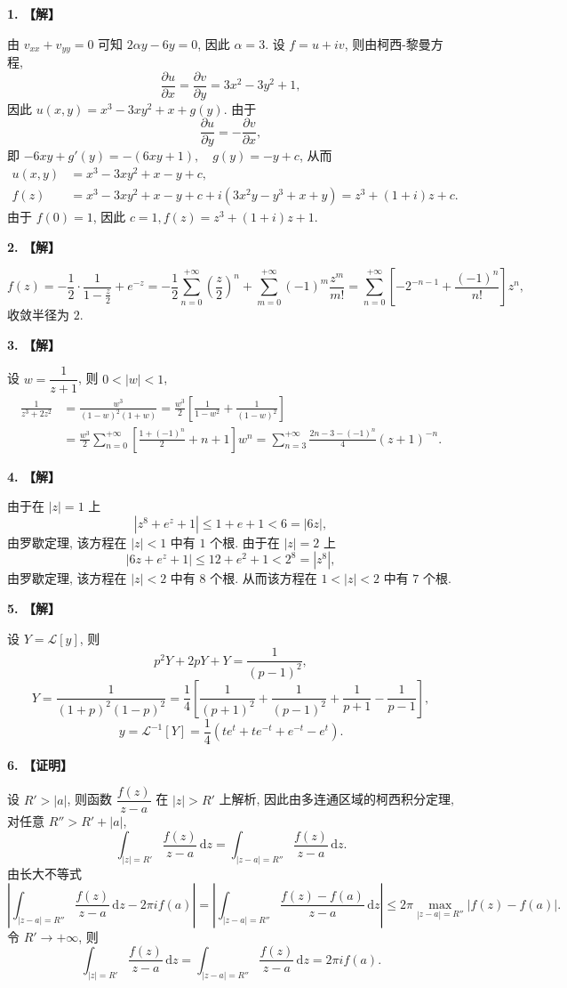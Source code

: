 \documentclass[simple]{hfutexam}
\newcommand{\diff}{\,\mathrm{d}}
\newcommand\msl{\mathscr{L}}
\begin{document}

\textbf{1. 【解】}

由 $v_{xx}+v_{yy}=0$ 可知 $2\alpha y-6y=0$, 因此 $\alpha=3$.
设 $f=u+iv$, 则由柯西-黎曼方程,
  \[\frac{\partial u}{\partial x}=\frac{\partial v}{\partial y}=3x^2-3y^2+1,\]
因此 $u(x,y)=x^3-3xy^2+x+g(y)$.
由于
  \[\frac{\partial u}{\partial y}=-\frac{\partial v}{\partial x},\]
即 $-6xy+g'(y)=-(6xy+1),\quad g(y)=-y+c$, 从而
\begin{align*}
u(x,y)&=x^3-3xy^2+x-y+c,\\
f(z)&=x^3-3xy^2+x-y+c+i(3x^2y-y^3+x+y)
  =z^3+(1+i)z+c.
\end{align*}
由于 $f(0)=1$, 因此 $c=1,f(z)=z^3+(1+i)z+1$.

\textbf{2. 【解】}

\[f(z)=-\frac{1}{2}\cdot\frac{1}{1-\frac z2}+e^{-z}
=-\frac{1}{2}\sum_{n=0}^{+\infty} \left(\frac{z}{2}\right)^n+\sum_{m=0}^{+\infty} (-1)^m\frac{z^m}{m!}
=\sum_{n=0}^{+\infty} \left[-2^{-n-1}+\frac{(-1)^n}{n!}\right]z^n,\]
收敛半径为 $2$.

\textbf{3. 【解】}

设 $w=\dfrac1{z+1}$, 则 $0<|w|<1$,
\begin{align*}
\frac{1}{z^3+2z^2}&=\frac{w^3}{(1-w)^2(1+w)}=\frac{w^3}{2}\left[\frac{1}{1-w^2}+\frac{1}{(1-w)^2}\right]\\
&=\frac{w^3}{2}\sum_{n=0}^{+\infty}\left[\frac{1+(-1)^n}{2}+n+1\right]w^n
=\sum_{n=3}^{+\infty}\frac{2n-3-(-1)^n}{4}(z+1)^{-n}.
\end{align*}

\textbf{4. 【解】}

由于在 $|z|=1$ 上
\[|z^8+e^z+1|\le 1+e+1<6=|6z|,\]
由罗歇定理, 该方程在 $|z|<1$ 中有 $1$ 个根. 由于在 $|z|=2$ 上
\[|6z+e^z+1|\le 12+e^2+1<2^8=|z^8|,\]
由罗歇定理, 该方程在 $|z|<2$ 中有 $8$ 个根.
从而该方程在 $1<|z|<2$ 中有 $7$ 个根.

\textbf{5. 【解】}

设 $Y=\msl[y]$, 则
\[p^2Y+2pY+Y=\frac{1}{(p-1)^2},\]
\[Y=\frac{1}{(1+p)^2(1-p)^2}=\frac{1}{4}\left[\frac{1}{(p+1)^2}+\frac{1}{(p-1)^2}+\frac{1}{p+1}-\frac{1}{p-1}\right],\]
\[y=\msl^{-1}[Y]=\frac{1}{4}(te^t+te^{-t}+e^{-t}-e^t).\]

\textbf{6. 【证明】}

设 $R'>|a|$, 则函数 $\dfrac{f(z)}{z-a}$ 在 $|z|>R'$ 上解析, 因此由多连通区域的柯西积分定理, 对任意 $R''>R'+|a|$,
  \[\int_{|z|=R'} \frac{f(z)}{z-a}\diff z=\int_{|z-a|=R''} \frac{f(z)}{z-a}\diff z.\]
由长大不等式
  \[\left|\int_{|z-a|=R''} \frac{f(z)}{z-a}\diff z-2\pi if(a)\right|
  =\left|\int_{|z-a|=R''} \frac{f(z)-f(a)}{z-a}\diff z\right|
  \le 2\pi \max_{|z-a|=R''}|f(z)-f(a)|.  \]
令 $R'\to+\infty$, 则 
  \[\int_{|z|=R'} \frac{f(z)}{z-a}\diff z=\int_{|z-a|=R''} \frac{f(z)}{z-a}\diff z=2\pi if(a).\]
\end{document}
